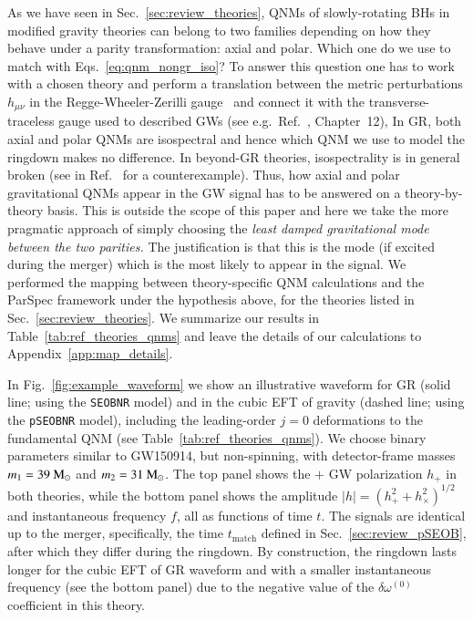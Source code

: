 \documentclass[twocolumn,
               prd,
               aps,
               superscriptaddress,
               tightenlines,
               nofootinbib,
               eqsecnum,
               amsfonts,
               amsmath,
               longbibliography]{revtex4-1}
\newcommand{\pSEOB}{\texttt{pSEOBNR}}
\newcommand{\msun}{~{\rm M}_{\odot}}
\begin{document}
As we have seen in Sec.~\ref{sec:review_theories}, QNMs of slowly-rotating
BHs in modified gravity theories can belong to two families depending on how
they behave under a parity transformation: axial and polar. Which one do
we use to match with Eqs.~\eqref{eq:qnm_nongr_iso}?
%
To answer this question one has to work with a chosen theory and perform a
translation between the metric perturbations $h_{\mu\nu}$ in the
Regge-Wheeler-Zerilli gauge~\cite{Regge:1957td,Zerilli:1970se} and connect it with the transverse-traceless gauge
used to described GWs (see e.g.~Ref.~\cite{Maggiore:2018sht}, Chapter~12),
%
In GR, both axial and polar QNMs are isospectral and hence which QNM we use to
model the ringdown makes no difference.
%
In beyond-GR theories, isospectrality is in general broken (see
in Ref.~\cite{Hui:2021cpm} for a counterexample).
%
Thus, how axial and polar gravitational QNMs appear in the GW signal has to be
answered on a theory-by-theory basis.
%
This is outside the scope of this paper and here we take the more pragmatic
approach of simply choosing the \emph{least damped gravitational mode between
the two parities.}
%
The justification is that this is the mode (if excited during the merger) which is
the most likely to appear in the signal.
We performed the mapping between theory-specific QNM calculations and the ParSpec framework
under the hypothesis above, for the theories listed in Sec.~\ref{sec:review_theories}.
%
We summarize our results in Table~\ref{tab:ref_theories_qnms} and
leave the details of our calculations to Appendix~\ref{app:map_details}.

In Fig.~\ref{fig:example_waveform} we show an illustrative waveform for GR (solid line; using the \texttt{SEOBNR} model) and in the cubic EFT of gravity (dashed line; using the \pSEOB{} model),
including the leading-order $j = 0$ deformations to the fundamental QNM (see Table~\ref{tab:ref_theories_qnms}).
%
We choose binary parameters similar to GW150914,  but non-spinning, with detector-frame masses
$m_1 = 39\msun$ and $m_2 = 31\msun$.
%
The top panel shows the $+$ GW polarization $h_{+}$ in both theories,
while the bottom panel shows the amplitude $|h| = (h_{+}^2 + h_{\times}^2)^{1/2}$
and instantaneous frequency $f$, all as functions of time $t$.
%
The signals are identical up to the merger, specifically, the time $t_\textrm{match}$
defined in Sec.~\ref{sec:review_pSEOB}, after which they differ during the ringdown.
%
By construction, the ringdown lasts longer for the cubic EFT of GR waveform and
with a smaller instantaneous frequency (see the bottom panel) due to the negative value of the
$\delta\omega^{(0)}$ coefficient in this theory.
\end{document}
